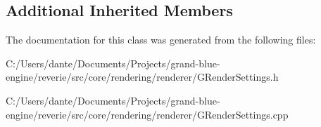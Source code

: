 \subsection*{Additional Inherited Members}


The documentation for this class was generated from the following files\+:\begin{DoxyCompactItemize}
\item 
C\+:/\+Users/dante/\+Documents/\+Projects/grand-\/blue-\/engine/reverie/src/core/rendering/renderer/G\+Render\+Settings.\+h\item 
C\+:/\+Users/dante/\+Documents/\+Projects/grand-\/blue-\/engine/reverie/src/core/rendering/renderer/G\+Render\+Settings.\+cpp\end{DoxyCompactItemize}
